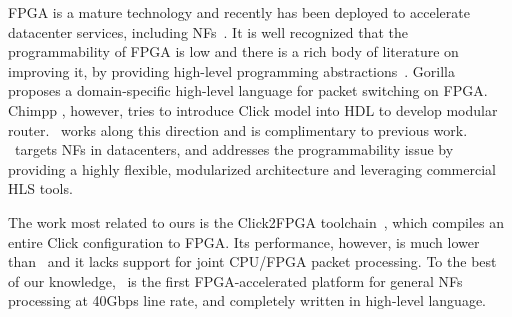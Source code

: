 FPGA is a mature technology and recently has been deployed to accelerate datacenter services, including NFs~\cite{putnam2014reconfigurable, smartnic, rubow2010chimpp, lavasani2012compiling}.
It is well recognized that the programmability of FPGA is low and there is a 
rich body of literature on improving it, 
by providing high-level programming abstractions~\cite{bluespec, auerbach2010lime, bacon2013fpga, singh2011implementing, bachrach2012chisel, wester2015transformation}.
%
Gorilla \cite{lavasani2012compiling} proposes a domain-specific high-level language for packet switching on FPGA.
Chimpp \cite{rubow2010chimpp}, however, tries to introduce Click model into HDL 
to develop modular router.
\name\ works along this direction and is complimentary to previous work.
\name\ targets NFs in datacenters, and addresses the programmability issue by
providing a highly flexible, modularized architecture and leveraging commercial HLS tools.

The work most related to ours is the Click2FPGA toolchain~\cite{Click2NetFPGA}, which compiles an entire Click configuration to FPGA. 
Its performance, however, is much lower than \name\ and it lacks support for 
joint CPU/FPGA packet processing.
%
To the best of our knowledge, \name\ is the first FPGA-accelerated platform for general NFs
processing at 40Gbps line rate, and completely written in high-level language.
